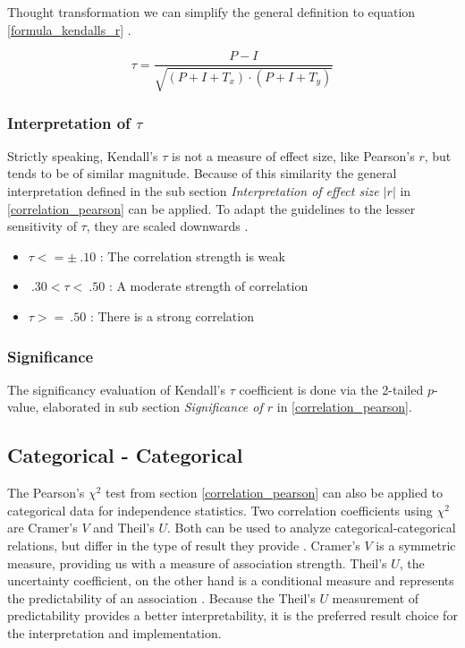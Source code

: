 \documentclass[a4paper,12pt]{report}
\begin{document}
\bigskip

Thought transformation we can simplify the general definition to equation \ref{formula_kendalls_r} \cite{Reiter2015}.

\begin{equation}
\label{formula_kendalls_r}
	\tau = \frac{P-I}{\sqrt{(P+I+T_x) \cdot (P+I+T_y)}}
\end{equation}

\subsubsection{Interpretation of $\tau$}
Strictly speaking, Kendall's $\tau$ is not a measure of effect size, like Pearson's $r$, but tends to be of similar magnitude. Because of this similarity the general interpretation defined in the sub section \textit{Interpretation of effect size $|r|$} in \ref{correlation_pearson} can be applied. To adapt the guidelines to the lesser sensitivity of $\tau$, they are scaled downwards \cite{Regber2016}.

\begin{itemize}
	\item $\tau <= \pm \: .10$ : The correlation strength is weak
	\item $\: .30 < \tau < \: .50$ : A moderate strength of correlation
	\item $\tau >= \: .50$ : There is a strong correlation
\end{itemize}

\subsubsection{Significance}
The significancy evaluation of Kendall's $\tau$ coefficient is done via the 2-tailed $p$-value, elaborated in sub section \textit{Significance of $r$} in \ref{correlation_pearson}.

\subsection{Categorical - Categorical}
The Pearson's $\chi^2$ test from section \ref{correlation_pearson} can also be applied to categorical data for independence statistics. Two correlation coefficients using $\chi^2$ are Cramer’s $V$ and Theil’s $U$. Both can be used to analyze categorical-categorical relations, but differ in the type of result they provide \cite{OutsideTwoStandardDeviations2018}. Cramer’s $V$ is a symmetric measure, providing us with a measure of association strength. Theil’s $U$, the uncertainty coefficient, on the other hand is a conditional measure and represents the predictability of an association \cite{Akoglu2018,StackExchange2020}. Because the Theil’s $U$ measurement of predictability provides a better interpretability, it is the preferred  result choice for the interpretation and implementation. 
\end{document}
